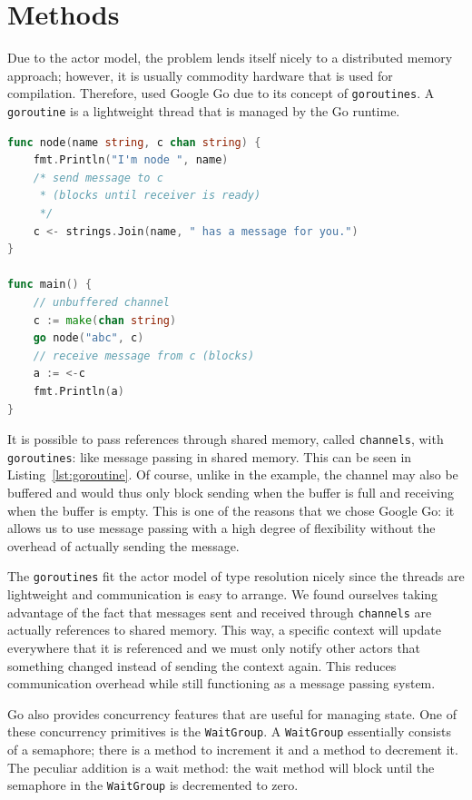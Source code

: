 \documentclass{acm_proc_article-sp}
\begin{document}
\section{Methods}


Due to the actor model, the problem lends itself nicely to a distributed memory
approach; however, it is usually commodity hardware that is used for
compilation. Therefore, used Google Go due to its concept of
\texttt{goroutines}. A \texttt{goroutine} is a lightweight thread that is
managed by the Go runtime.

\begin{lstlisting}[caption=Small \texttt{goroutine} example with
\texttt{channels},language=Go,label=lst:goroutine]
func node(name string, c chan string) {
	fmt.Println("I'm node ", name)
	/* send message to c
	 * (blocks until receiver is ready)
	 */
	c <- strings.Join(name, " has a message for you.")
}

func main() {
	// unbuffered channel
	c := make(chan string)
	go node("abc", c)
	// receive message from c (blocks)
	a := <-c
	fmt.Println(a)
}
\end{lstlisting}

It is possible to pass references through shared memory, called
\texttt{channels}, with \texttt{goroutines}: like message passing in shared
memory. This can be seen in Listing~\ref{lst:goroutine}. Of course, unlike in
the example, the channel may also be buffered and would thus only block sending
when the buffer is full and receiving when the buffer is empty. This is one of
the reasons that we chose Google Go: it allows us to use message passing
with a high degree of flexibility without the overhead of actually sending the message.


The \texttt{goroutines} fit the actor model of type resolution nicely since the
threads are lightweight and communication is easy to arrange. We found
ourselves taking advantage of the fact that messages sent and received through
\texttt{channels} are actually references to shared memory. This way, a
specific context will update everywhere that it is referenced and we must only
notify other actors that something changed instead of sending the context
again. This reduces communication overhead while still functioning as a message
passing system.

Go also provides concurrency features that are useful for managing state. One
of these concurrency primitives is the \texttt{WaitGroup}. A \texttt{WaitGroup}
essentially consists of a semaphore; there is a method to increment it and a
method to decrement it. The peculiar addition is a wait method: the wait method
will block until the semaphore in the \texttt{WaitGroup} is decremented to
zero.
\end{document}
